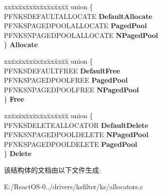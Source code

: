 \begin{DoxyCompactItemize}
\begin{tabbing}
\end{tabbing}\item 
\mbox{\label{struct_a_l_l_o_c_a_t_o_r_a1d16d1a73ca0ceb9e20cc8bf19cd18de}} 
\begin{tabbing}
xx\=xx\=xx\=xx\=xx\=xx\=xx\=xx\=xx\=\kill
union \{\\
\>PFNKSDEFAULTALLOCATE {\bfseries DefaultAllocate}\\
\>PFNKSPAGEDPOOLALLOCATE {\bfseries PagedPool}\\
\>PFNKSNPAGEDPOOLALLOCATE {\bfseries NPagedPool}\\
\} {\bfseries Allocate}\\

\end{tabbing}\item 
\mbox{\label{struct_a_l_l_o_c_a_t_o_r_ac10ee67c4a42c67745b547437f1b1ce0}} 
\begin{tabbing}
xx\=xx\=xx\=xx\=xx\=xx\=xx\=xx\=xx\=\kill
union \{\\
\>PFNKSDEFAULTFREE {\bfseries DefaultFree}\\
\>PFNKSPAGEDPOOLFREE {\bfseries PagedPool}\\
\>PFNKSNPAGEDPOOLFREE {\bfseries NPagedPool}\\
\} {\bfseries Free}\\

\end{tabbing}\item 
\mbox{\label{struct_a_l_l_o_c_a_t_o_r_a1ab21a342241220f127c39bfb7f284dc}} 
\begin{tabbing}
xx\=xx\=xx\=xx\=xx\=xx\=xx\=xx\=xx\=\kill
union \{\\
\>PFNKSDELETEALLOCATOR {\bfseries DefaultDelete}\\
\>PFNKSNPAGEDPOOLDELETE {\bfseries NPagedPool}\\
\>PFNKSPAGEDPOOLDELETE {\bfseries PagedPool}\\
\} {\bfseries Delete}\\

\end{tabbing}\end{DoxyCompactItemize}


该结构体的文档由以下文件生成\+:\begin{DoxyCompactItemize}
\item 
E\+:/\+React\+O\+S-\/0../drivers/ksfilter/ks/allocators.\+c\end{DoxyCompactItemize}
